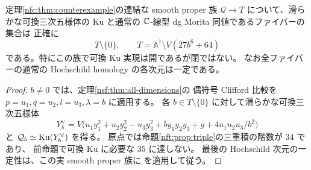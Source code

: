 \begin{corollary}
\label{nft:cor:nonclosed-cubic-locus}
定理\ref{nfc:thm:counterexample}の連結な smooth proper 族
$\mathcal Q\to T$ について、滑らかな可換三次五様体の
Ku と通常の $\mathbb C$-線型 dg Morita 同値であるファイバーの集合は
正確に
\[
   T\setminus\{0\},\qquad
   T=\mathbb A^1\setminus V(27b^6+64)
\]
である。特にこの族で可換 Ku 実現は開であるが閉ではない。
なお全ファイバーの通常の Hochschild homology の各次元は一定である。
\end{corollary}
\begin{proof}
$b\ne0$ では、定理\ref{nsf:thm:all-dimensions}の
偶符号 Clifford 比較を $p=u_1,q=u_2,l=u_3,\lambda=b$ に適用する。
各 $b\in T\setminus\{0\}$ に対して滑らかな可換三次五様体
\[
 Y_b^\vee=V\bigl(
 u_1y_1^2+u_2y_2^2-u_3y_3^2+
 by_1y_2y_3+g+4u_1u_2u_3/b^2\bigr)
\]
と $\mathcal Q_b\simeq\operatorname{Ku}(Y_b^\vee)$ を得る。
原点では命題\ref{nft:prop:triple}の三重積の階数が $34$ であり、
前命題で可換 Ku に必要な $35$ に達しない。
最後の Hochschild 次元の一定性は、この実 smooth proper 族に
\cite[Theorem~3.5]{QFOPerryHodge} を適用して従う。
\end{proof}

